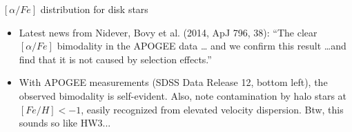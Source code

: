\documentclass[letterpaper,landscape]{slides}
\begin{document}
\begin{slide}
{\begin{minipage}[t]{12cm}
\begin{center}
\end{center}
\end{minipage}


\begin{minipage}[t]{12cm} 
\vskip -1in
\begin{center}
{\large \color{red}  $[\alpha/Fe]$ distribution for disk stars}
\end{center}
\begin{itemize}
\item Latest news from Nidever, Bovy et al. (2014, ApJ 796, 38): 
``The clear $[\alpha/Fe]$ bimodality in the APOGEE data \dots
and we confirm this result \dots and find that it is not caused by selection effects.''
\item 
With APOGEE measurements (SDSS Data Release 12, bottom left), the
observed bimodality is self-evident. Also, note contamination by halo
stars at $[Fe/H] < -1$, easily recognized from elevated velocity dispersion. 
Btw, this sounds so like HW3...
\end{itemize} 
\end{minipage}}
\vfill 
\end{slide}
\end{document}
